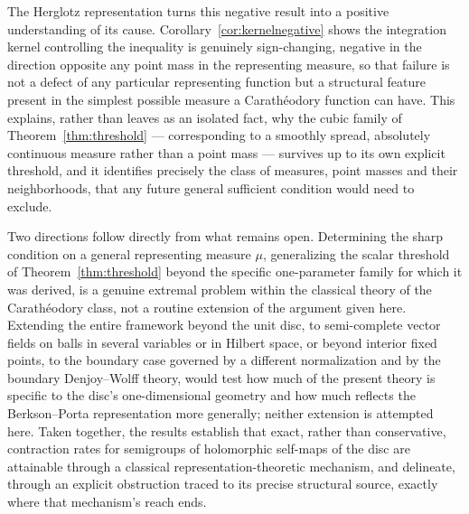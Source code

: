 \documentclass[pdflatex,sn-mathphys-num]{sn-jnl}%
\theoremstyle{thmstyleone}%
\theoremstyle{thmstyletwo}%
\theoremstyle{thmstylethree}%
\begin{document}
The Herglotz representation turns this negative result into a positive understanding of its cause. Corollary~\ref{cor:kernelnegative} shows the integration kernel controlling the inequality is genuinely sign-changing, negative in the direction opposite any point mass in the representing measure, so that failure is not a defect of any particular representing function but a structural feature present in the simplest possible measure a Carath\'eodory function can have. This explains, rather than leaves as an isolated fact, why the cubic family of Theorem~\ref{thm:threshold} --- corresponding to a smoothly spread, absolutely continuous measure rather than a point mass --- survives up to its own explicit threshold, and it identifies precisely the class of measures, point masses and their neighborhoods, that any future general sufficient condition would need to exclude.

Two directions follow directly from what remains open. Determining the sharp condition on a general representing measure $\mu$, generalizing the scalar threshold of Theorem~\ref{thm:threshold} beyond the specific one-parameter family for which it was derived, is a genuine extremal problem within the classical theory of the Carath\'eodory class, not a routine extension of the argument given here. Extending the entire framework beyond the unit disc, to semi-complete vector fields on balls in several variables or in Hilbert space, or beyond interior fixed points, to the boundary case governed by a different normalization and by the boundary Denjoy--Wolff theory, would test how much of the present theory is specific to the disc's one-dimensional geometry and how much reflects the Berkson--Porta representation more generally; neither extension is attempted here. Taken together, the results establish that exact, rather than conservative, contraction rates for semigroups of holomorphic self-maps of the disc are attainable through a classical representation-theoretic mechanism, and delineate, through an explicit obstruction traced to its precise structural source, exactly where that mechanism's reach ends.


\backmatter

%
%
%
\end{document}
